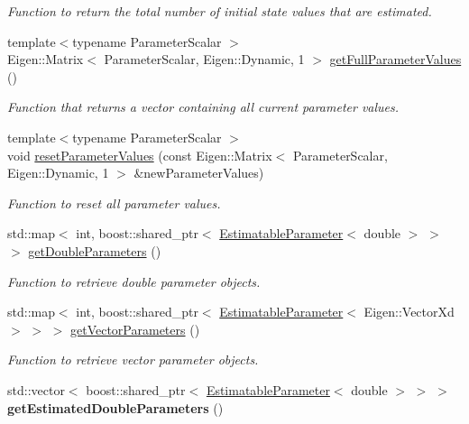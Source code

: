 \begin{DoxyCompactItemize}
\begin{DoxyCompactList}\small\item\em Function to return the total number of initial state values that are estimated. \end{DoxyCompactList}\item 
{\footnotesize template$<$typename Parameter\+Scalar $>$ }\\Eigen\+::\+Matrix$<$ Parameter\+Scalar, Eigen\+::\+Dynamic, 1 $>$ \hyperlink{classtudat_1_1estimatable__parameters_1_1EstimatableParameterSet_af42f2138fb76a555002aa053f0028104}{get\+Full\+Parameter\+Values} ()
\begin{DoxyCompactList}\small\item\em Function that returns a vector containing all current parameter values. \end{DoxyCompactList}\item 
{\footnotesize template$<$typename Parameter\+Scalar $>$ }\\void \hyperlink{classtudat_1_1estimatable__parameters_1_1EstimatableParameterSet_adc772df222511eab4f5dc4373b5067ad}{reset\+Parameter\+Values} (const Eigen\+::\+Matrix$<$ Parameter\+Scalar, Eigen\+::\+Dynamic, 1 $>$ \&new\+Parameter\+Values)
\begin{DoxyCompactList}\small\item\em Function to reset all parameter values. \end{DoxyCompactList}\item 
std\+::map$<$ int, boost\+::shared\+\_\+ptr$<$ \hyperlink{classtudat_1_1estimatable__parameters_1_1EstimatableParameter}{Estimatable\+Parameter}$<$ double $>$ $>$ $>$ \hyperlink{classtudat_1_1estimatable__parameters_1_1EstimatableParameterSet_a96b66242d70e2987c8788261e8d2a546}{get\+Double\+Parameters} ()
\begin{DoxyCompactList}\small\item\em Function to retrieve double parameter objects. \end{DoxyCompactList}\item 
std\+::map$<$ int, boost\+::shared\+\_\+ptr$<$ \hyperlink{classtudat_1_1estimatable__parameters_1_1EstimatableParameter}{Estimatable\+Parameter}$<$ Eigen\+::\+Vector\+Xd $>$ $>$ $>$ \hyperlink{classtudat_1_1estimatable__parameters_1_1EstimatableParameterSet_a500ea821fa7ba0b64132f46015c583c0}{get\+Vector\+Parameters} ()
\begin{DoxyCompactList}\small\item\em Function to retrieve vector parameter objects. \end{DoxyCompactList}\item 
std\+::vector$<$ boost\+::shared\+\_\+ptr$<$ \hyperlink{classtudat_1_1estimatable__parameters_1_1EstimatableParameter}{Estimatable\+Parameter}$<$ double $>$ $>$ $>$ {\bfseries get\+Estimated\+Double\+Parameters} ()\hypertarget{classtudat_1_1estimatable__parameters_1_1EstimatableParameterSet_ae780d650380184ca37cf92f80cc7e9a3}{}\label{classtudat_1_1estimatable__parameters_1_1EstimatableParameterSet_ae780d650380184ca37cf92f80cc7e9a3}


\end{DoxyCompactItemize}
